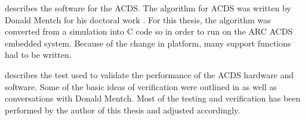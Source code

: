  describes the software for the \ac{ACDS}. The algorithm for \ac{ACDS} was written by Donald Mentch for his doctoral work \cite{Mentch11}. For this thesis, the algorithm was converted from a \matlab simulation into C code so in order to run on the \ac{ARC} \ac{ACDS} embedded system. Because of the change in platform, many support functions had to be written.

 describes the test used to validate the performance of the ACDS hardware and software. Some of the basic ideas of verification were outlined in \cite{Mentch11} as well as conversations with Donald Mentch. Most of the testing and verification has been performed by the author of this thesis and adjusted accordingly.

